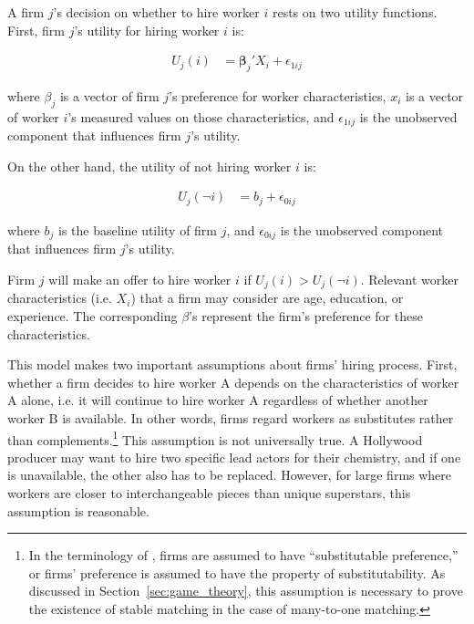A firm $j$'s decision on whether to hire worker $i$ rests on two utility
functions. First, firm $j$'s utility for hiring worker $i$ is:

\begin{align}
  U_j(i) &= \bm{\beta}_j' X_i + \epsilon_{1ij}
\end{align}

where $\beta_j$ is a vector of firm $j$'s preference for worker characteristics,
$x_i$ is a vector of worker $i$'s measured values on those characteristics, and
$\epsilon_{1ij}$ is the unobserved component that influences firm $j$'s utility.

On the other hand, the utility of not hiring worker $i$ is:

\begin{align}
  U_j(\neg i) &= b_j + \epsilon_{0ij}
\end{align}

where $b_j$ is the baseline utility of firm $j$, and $\epsilon_{0ij}$ is the
unobserved component that influences firm $j$'s utility.

Firm $j$ will make an offer to hire worker $i$ if $U_j(i) > U_j(\neg i)$.
Relevant worker characteristics (i.e. $X_i$) that a firm may consider are age,
education, or experience. The corresponding $\beta$'s represent the firm's
preference for these characteristics.

This model makes two important assumptions about firms' hiring process. First,
whether a firm decides to hire worker A depends on the characteristics of worker
A alone, i.e. it will continue to hire worker A regardless of whether another
worker B is available. In other words, firms regard workers as substitutes
rather than complements.\footnote{In the terminology of \citet{Roth1992}, firms
  are assumed to have ``substitutable preference,'' or firms' preference is
  assumed to have the property of substitutability. As discussed in
  Section~\ref{sec:game_theory}, this assumption is necessary to prove the
  existence of stable matching in the case of many-to-one matching.} This
assumption is not universally true. A Hollywood producer may want to hire two
specific lead actors for their chemistry, and if one is unavailable, the other
also has to be replaced. However, for large firms where workers are closer to
interchangeable pieces than unique superstars, this assumption is reasonable.

